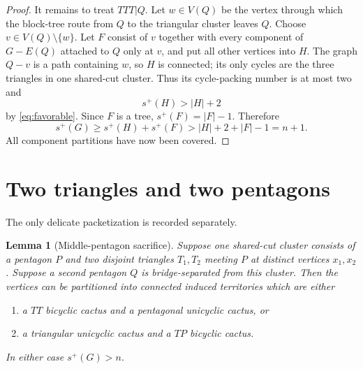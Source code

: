 \documentclass[11pt]{article}
\newtheorem{lemma}[theorem]{Lemma}
\newcommand{\spE}{s^+}
\begin{document}
\begin{proof}
It remains to treat $TTT|Q$.  Let $w\in V(Q)$ be the vertex through which the
block-tree route from $Q$ to the triangular cluster leaves $Q$.  Choose
$v\in V(Q)\setminus\{w\}$.  Let $F$ consist of $v$ together with every
component of $G-E(Q)$ attached to $Q$ only at $v$, and put all other vertices
into $H$.  The graph $Q-v$ is a path containing $w$, so $H$ is
connected; its only cycles are the three triangles in one shared-cut cluster.
Thus its cycle-packing number is at most two and
\[
 \spE(H)>|H|+2
\]
by \eqref{eq:favorable}.  Since $F$ is a tree,
$\spE(F)=|F|-1$.  Therefore
\[
 \spE(G)\geq\spE(H)+\spE(F)>|H|+2+|F|-1=n+1.
\]
All component partitions have now been covered.
\end{proof}

\section{Two triangles and two pentagons}

The only delicate packetization is recorded separately.

\begin{lemma}[Middle-pentagon sacrifice]\label{lem:sacrifice}
Suppose one shared-cut cluster consists of a pentagon $P$ and two disjoint
triangles $T_1,T_2$ meeting $P$ at distinct vertices $x_1,x_2$.  Suppose a
second pentagon $Q$ is bridge-separated from this cluster.  Then the vertices
can be partitioned into connected induced territories which are either
\begin{enumerate}
\item a $TT$ bicyclic cactus and a pentagonal unicyclic cactus, or
\item a triangular unicyclic cactus and a $TP$ bicyclic cactus.
\end{enumerate}
In either case $\spE(G)>n$.
\end{lemma}
\end{document}

